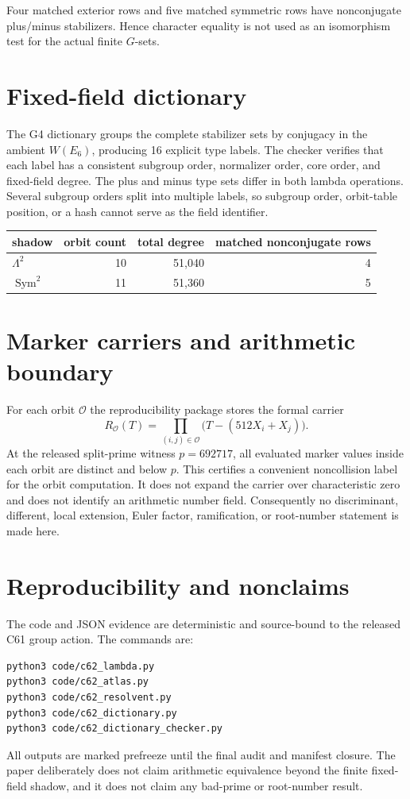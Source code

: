 \documentclass[11pt]{article}
\begin{document}
Four matched exterior rows and five matched symmetric rows have
nonconjugate plus/minus stabilizers.  Hence character equality is not used as
an isomorphism test for the actual finite $G$-sets.

\section{Fixed-field dictionary}
The G4 dictionary groups the complete stabilizer sets by conjugacy in the
ambient $W(E_6)$, producing 16 explicit type labels.  The checker verifies
that each label has a consistent subgroup order, normalizer order, core order,
and fixed-field degree.  The plus and minus type sets differ in both lambda
operations.  Several subgroup orders split into multiple labels, so subgroup
order, orbit-table position, or a hash cannot serve as the field identifier.

\begin{center}
\begin{tabular}{lrrr}
\toprule
shadow & orbit count & total degree & matched nonconjugate rows\\
\midrule
$\Lambda^2$ & 10 & 51,040 & 4\\
$\operatorname{Sym}^2$ & 11 & 51,360 & 5\\
\bottomrule
\end{tabular}
\end{center}

\section{Marker carriers and arithmetic boundary}
For each orbit $\mathcal O$ the reproducibility package stores the formal
carrier
\[
 R_{\mathcal O}(T)=\prod_{(i,j)\in\mathcal O}
 \bigl(T-(512X_i+X_j)\bigr).
\]
At the released split-prime witness $p=692717$, all evaluated marker values
inside each orbit are distinct and below $p$.  This certifies a convenient
noncollision label for the orbit computation.  It does not expand the carrier
over characteristic zero and does not identify an arithmetic number field.
Consequently no discriminant, different, local extension, Euler factor,
ramification, or root-number statement is made here.

\section{Reproducibility and nonclaims}
The code and JSON evidence are deterministic and source-bound to the released
C61 group action.  The commands are:
\begin{verbatim}
python3 code/c62_lambda.py
python3 code/c62_atlas.py
python3 code/c62_resolvent.py
python3 code/c62_dictionary.py
python3 code/c62_dictionary_checker.py
\end{verbatim}
All outputs are marked prefreeze until the final audit and manifest closure.
The paper deliberately does not claim arithmetic equivalence beyond the
finite fixed-field shadow, and it does not claim any bad-prime or root-number
result.
\end{document}
